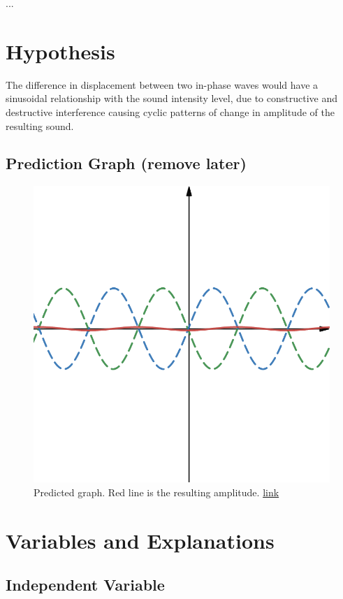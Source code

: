 \documentclass[12pt]{article}
\begin{document}
...

\section{Hypothesis}

The difference in displacement between two in-phase waves would have a sinusoidal relationship with the sound intensity level, due to constructive and destructive interference causing cyclic patterns of change in amplitude of the resulting sound.

\subsection{Prediction Graph (remove later)}


\begin{figure}[H]
    \centering
    \includegraphics[scale=0.3]{prediction.png}
    \caption{Predicted graph. Red line is the resulting amplitude. \href{https://www.desmos.com/calculator/ahmohu46il}{link}}
\end{figure}

\section{Variables and Explanations}

\subsection{Independent Variable}
\end{document}
